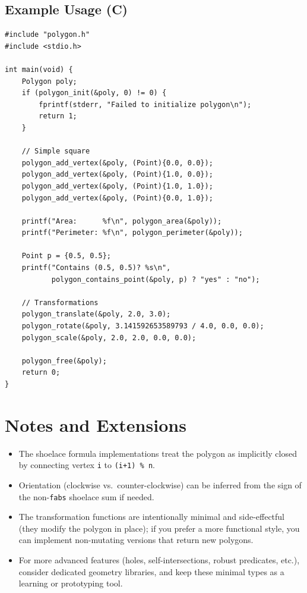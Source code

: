 \documentclass[11pt,a4paper]{article}
\begin{document}
\subsection{Example Usage (C)}

\begin{verbatim}
#include "polygon.h"
#include <stdio.h>

int main(void) {
    Polygon poly;
    if (polygon_init(&poly, 0) != 0) {
        fprintf(stderr, "Failed to initialize polygon\n");
        return 1;
    }

    // Simple square
    polygon_add_vertex(&poly, (Point){0.0, 0.0});
    polygon_add_vertex(&poly, (Point){1.0, 0.0});
    polygon_add_vertex(&poly, (Point){1.0, 1.0});
    polygon_add_vertex(&poly, (Point){0.0, 1.0});

    printf("Area:      %f\n", polygon_area(&poly));
    printf("Perimeter: %f\n", polygon_perimeter(&poly));

    Point p = {0.5, 0.5};
    printf("Contains (0.5, 0.5)? %s\n",
           polygon_contains_point(&poly, p) ? "yes" : "no");

    // Transformations
    polygon_translate(&poly, 2.0, 3.0);
    polygon_rotate(&poly, 3.141592653589793 / 4.0, 0.0, 0.0);
    polygon_scale(&poly, 2.0, 2.0, 0.0, 0.0);

    polygon_free(&poly);
    return 0;
}
\end{verbatim}

\clearpage

\section{Notes and Extensions}

\begin{itemize}[leftmargin=*]
  \item The shoelace formula implementations treat the polygon as implicitly closed
        by connecting vertex \texttt{i} to \texttt{(i+1) \% n}.
  \item Orientation (clockwise vs.\ counter-clockwise) can be inferred from the sign
        of the non-\texttt{fabs} shoelace sum if needed.
  \item The transformation functions are intentionally minimal and side-effectful
        (they modify the polygon in place); if you prefer a more functional style,
        you can implement non-mutating versions that return new polygons.
  \item For more advanced features (holes, self-intersections, robust predicates, etc.),
        consider dedicated geometry libraries, and keep these minimal types as a
        learning or prototyping tool.
\end{itemize}

\clearpage
\end{document}
